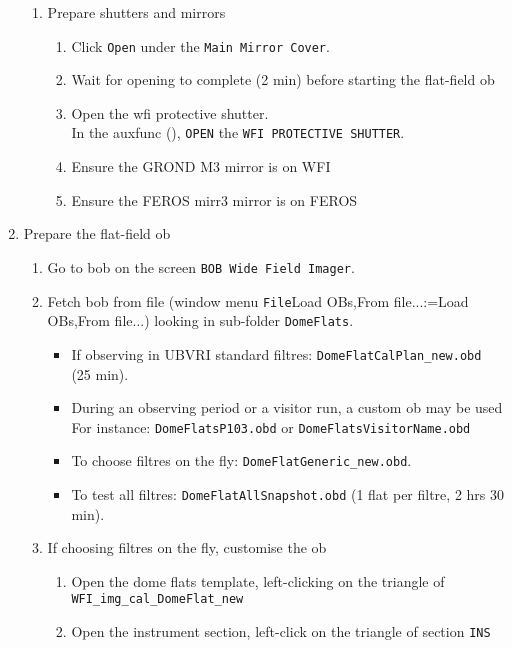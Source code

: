 \documentclass[11pt,fleqn,a4paper]{book}
\makeatletter
\def\menu#1#2{\texttt{#1}\ifx{}#2\else\@for\@x:=#2\do{$\rightarrow$\texttt{\@x}}\fi}
\def\wmenu#1#2{window menu \menu{#1}{#2}}
\def\fetchob{\wmenu{File}{Load OBs,From file...}}
\makeatother
\begin{document}
\begin{enumerate}
\begin{enumerate}
            \item Prepare shutters and mirrors
            \begin{enumerate}
               \item Click \texttt{Open} under the \texttt{Main Mirror Cover}.
               \item Wait for opening to complete (2 min) before starting the flat-field \gls{ob}
               \item Open the \gls{wfi} \gls{protective shutter}.\\
                     In the \gls{auxfunc} (), \texttt{OPEN} the \texttt{WFI PROTECTIVE SHUTTER}.
               \item Ensure the GROND \gls{M3} mirror is on WFI
               \item Ensure the FEROS \gls{mirr3} mirror is on FEROS
             \end{enumerate}
         \end{enumerate}
     \item Prepare the flat-field \gls{ob}
     \begin{enumerate}
        \item Go to \gls{bob} on the screen \texttt{BOB Wide Field Imager}.
        \item Fetch \gls{bob} from file (\fetchob) looking in sub-folder \texttt{DomeFlats}.
        \begin{itemize}
           \item If observing in UBVRI standard filtres: \texttt{DomeFlatCalPlan\_new.obd} (25 min).
           \item During an observing period or a \gls{visitor} run, a custom \gls{ob} may be used\\
    For instance: \texttt{DomeFlatsP103.obd} or \texttt{DomeFlatsVisitorName.obd}
           \item To choose filtres on the fly: \texttt{DomeFlatGeneric\_new.obd}.
           \item To test all filtres: \texttt{DomeFlatAllSnapshot.obd} (1 flat per filtre, 2 hrs 30 min).
        \end{itemize}
        \item If choosing filtres on the fly, customise the ob
              \begin{enumerate}
                 \item Open the \gls{dome flats} \gls{template}, left-clicking on the triangle of \texttt{WFI\_img\_cal\_DomeFlat\_new}
                 \item Open the instrument section, left-click on the triangle of section \texttt{INS}

\end{enumerate}
\end{enumerate}
\end{enumerate}
\end{document}
